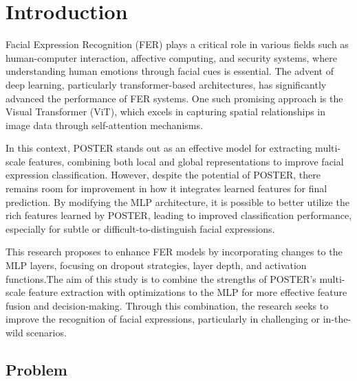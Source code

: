 \chapter{Introduction}
\label{chapter:introduction}
%
%

Facial Expression Recognition (FER) plays a critical role in various fields such as human-computer interaction, affective computing, and security systems, where understanding human emotions through facial cues is essential. The advent of deep learning, particularly transformer-based architectures, has significantly advanced the performance of FER systems. One such promising approach is the Visual Transformer (ViT), which excels in capturing spatial relationships in image data through self-attention mechanisms.

In this context, POSTER \cite{zheng_poster_2022} stands out as an effective model for extracting multi-scale features, combining both local and global representations to improve facial expression classification. However, despite the potential of POSTER, there remains room for improvement in how it integrates learned features for final prediction. By modifying the MLP architecture, it is possible to better utilize the rich features learned by POSTER, leading to improved classification performance, especially for subtle or difficult-to-distinguish facial expressions. 


This research proposes to enhance FER models by incorporating changes to the MLP layers, focusing on dropout strategies, layer depth, and activation functions.The aim of this study is to combine the strengths of POSTER’s multi-scale feature extraction with optimizations to the MLP for more effective feature fusion and decision-making. Through this combination, the research seeks to improve the recognition of facial expressions, particularly in challenging or in-the-wild scenarios. 

\newpage

\section{Problem}


%

